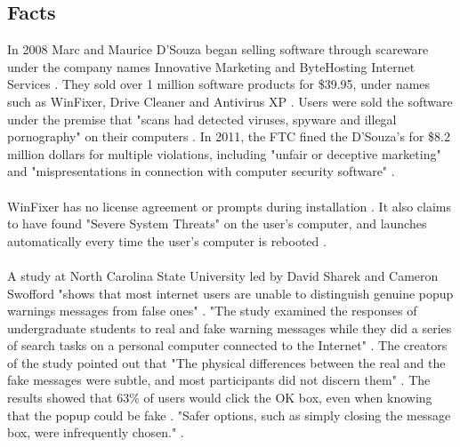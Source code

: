 \documentclass[11pt]{article}
\begin{document}
\newpage



\begin{multicols}{2}
\setcounter{page}{1}

\section{Facts}
In 2008 Marc and Maurice D'Souza began selling software through scareware under the company names Innovative Marketing and ByteHosting Internet Services \cite{pcworld8.2million}. They sold over 1 million software products for \$39.95, under names such as WinFixer, Drive Cleaner and Antivirus XP \cite{pcworld8.2million}. Users were sold the software under the premise that "scans had detected viruses, spyware and illegal pornography" on their computers \cite{pcworld8.2million}. In 2011, the FTC fined the D'Souza's for \$8.2 million dollars for multiple violations, including "unfair or deceptive marketing" and "mispresentations in connection with computer security software" \cite{ftcorder}. \\
\vspace{10pt} \\
WinFixer has no license agreement or prompts during installation \cite{badwarewinfixer}. It also claims to have found "Severe System Threats" on the user's computer, and launches automatically every time the user's computer is rebooted \cite{badwarewinfixer}. \\
\vspace{10pt} \\
A study at North Carolina State University led by David Sharek and Cameron Swofford "shows that most internet users are unable to distinguish genuine popup warnings messages from false ones" \cite{ncsupaper}. "The study examined the responses of undergraduate students to real and fake warning messages while they did a series of search tasks on a personal computer connected to the Internet" \cite{ncsupaper}. The creators of the study pointed out that "The physical differences between the real and the fake messages were subtle, and most participants did not discern them" \cite{ncsupaper}. The results showed that 63\% of users would click the OK box, even when knowing that the popup could be fake \cite{ncsupaper}. "Safer options, such as simply closing the message box, were infrequently chosen." \cite{ncsupaper}.

\end{multicols}
\end{document}
